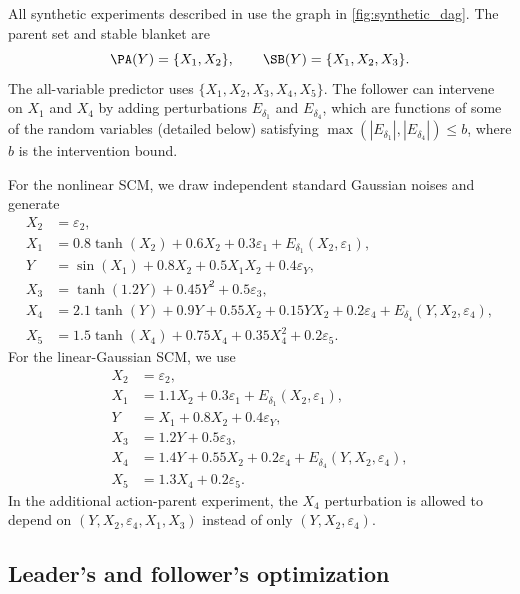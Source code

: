 All synthetic experiments 
described in 
use the graph in \cref{fig:synthetic_dag}.
The parent set and stable blanket are
\[
    \PA(Y)=\{X_1,X_2\},
    \qquad
    \SB(Y)=\{X_1,X_2,X_3\}.
\]
The all-variable predictor uses $\{X_1,X_2,X_3,X_4,X_5\}$.
The follower can intervene on $X_1$ and $X_4$
by adding perturbations
$E_{\delta_1}$ and $E_{\delta_4}$,
which are functions of some of the random variables (detailed below) satisfying
$\max(|E_{\delta_1}|,|E_{\delta_4}|)
\leq b$, where
$b$ is the intervention
bound.

For the nonlinear SCM, we draw independent standard Gaussian noises and generate
\begin{align*}
    X_2 &= \varepsilon_2,\\
    X_1 &= 0.8\tanh(X_2)+0.6X_2+0.3\varepsilon_1+E_{\delta_1}(X_2,\varepsilon_1),\\
    Y &= \sin(X_1)+0.8X_2+0.5X_1X_2+0.4\varepsilon_Y,\\
    X_3 &= \tanh(1.2Y)+0.45Y^2+0.5\varepsilon_3,\\
    X_4 &= 2.1\tanh(Y)+0.9Y+0.55X_2+0.15YX_2+0.2\varepsilon_4
          +E_{\delta_4}(Y,X_2,\varepsilon_4),\\
    X_5 &= 1.5\tanh(X_4)+0.75X_4+0.35X_4^2+0.2\varepsilon_5.
\end{align*}
For the linear-Gaussian SCM, we use
\begin{align*}
    X_2 &= \varepsilon_2,\\
    X_1 &= 1.1X_2+0.3\varepsilon_1+E_{\delta_1}(X_2,\varepsilon_1),\\
    Y &= X_1+0.8X_2+0.4\varepsilon_Y,\\
    X_3 &= 1.2Y+0.5\varepsilon_3,\\
    X_4 &= 1.4Y+0.55X_2+0.2\varepsilon_4+E_{\delta_4}(Y,X_2,\varepsilon_4),\\
    X_5 &= 1.3X_4+0.2\varepsilon_5.
\end{align*}
In the additional action-parent experiment, the $X_4$ perturbation is allowed to
depend on $(Y,X_2,\varepsilon_4,X_1,X_3)$ instead of only
$(Y,X_2,\varepsilon_4)$.


\subsection{Leader's and follower's optimization}
\label{sec:sdfds}

